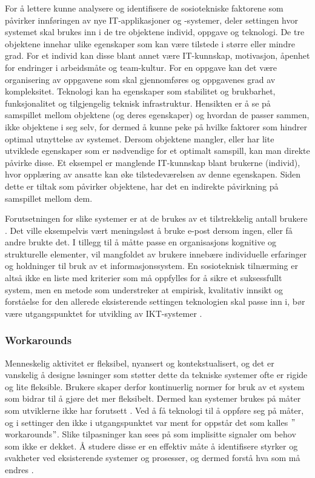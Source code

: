\noindent
For å lettere kunne analysere og identifisere de sosiotekniske faktorene som påvirker innføringen av nye IT-applikasjoner og -systemer, deler \citet{FITT} settingen hvor systemet skal brukes inn i de tre objektene individ, oppgave og teknologi. De tre objektene innehar ulike egenskaper som kan være tilstede i større eller mindre grad. For et individ kan disse blant annet være IT-kunnskap, motivasjon, åpenhet for endringer i arbeidsmåte og team-kultur. For en oppgave kan det være organisering av oppgavene som skal gjennomføres og oppgavenes grad av kompleksitet. Teknologi kan ha egenskaper som stabilitet og brukbarhet, funksjonalitet og tilgjengelig teknisk infrastruktur. Hensikten er å se på samspillet mellom objektene (og deres egenskaper) og hvordan de passer sammen, ikke objektene i seg selv, for dermed å kunne peke på hvilke faktorer som hindrer optimal utnyttelse av systemet. Dersom objektene mangler, eller har lite utviklede egenskaper som er nødvendige for et optimalt samspill, kan man direkte påvirke disse. Et eksempel er manglende IT-kunnskap blant brukerne (individ), hvor opplæring av ansatte kan øke tilstedeværelsen av denne egenskapen. Siden dette er tiltak som påvirker objektene, har det en indirekte påvirkning på samspillet mellom dem. 

\noindent
Forutsetningen for slike systemer er at de brukes av et tilstrekkelig antall brukere \citep{Ackerman00}. Det ville eksempelvis vært meningsløst å bruke e-post dersom ingen, eller få andre brukte det. I tillegg til å måtte passe en organisasjons kognitive og strukturelle elementer, vil mangfoldet av brukere innebære individuelle erfaringer og holdninger til bruk av et informasjonssystem. En sosioteknisk tilnærming er altså ikke en liste med kriterier som må oppfylles for å sikre et suksessfullt system, men en metode som understreker at empirisk, kvalitativ innsikt og forståelse for den allerede eksisterende settingen teknologien skal passe inn i, bør være utgangspunktet for utvikling av IKT-systemer \citep{Berg99}. 

\subsubsection{Workarounds}
\label{sec:workarounds}
Menneskelig aktivitet er fleksibel, nyansert og kontekstualisert, og det er vanskelig å designe løsninger som støtter dette da tekniske systemer ofte er rigide og lite fleksible. Brukere skaper derfor kontinuerlig normer for bruk av et system som bidrar til å gjøre det mer fleksibelt. Dermed kan systemer brukes på måter som utviklerne ikke har forutsett \citep{Ackerman00}. Ved å få teknologi til å oppføre seg på måter, og i settinger den ikke i utgangspunktet var ment for oppstår det som kalles $"$workarounds$"$. Slike tilpasninger kan sees på som implisitte signaler om behov som ikke er dekket. Å studere disse er en effektiv måte å identifisere styrker og svakheter ved eksisterende systemer og prosesser, og dermed forstå hva som må endres \citep{Coiera07}. 

